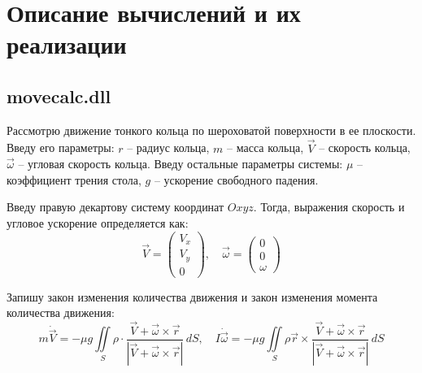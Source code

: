 \documentclass[12pt]{report}
\begin{document}
\section*{\centering Описание вычислений и их реализации}
\subsection*{\centering movecalc.dll}
\indent \indent
Рассмотрю движение тонкого кольца по шероховатой поверхности в ее плоскости.
Введу его параметры: $r$ -- радиус кольца, $m$ -- масса кольца, $\vec V$ -- скорость кольца, $\vec \omega$ -- угловая скорость кольца.
Введу остальные параметры системы: $\mu$ -- коэффициент трения стола, $g$ -- ускорение свободного падения.

Введу правую декартову систему координат $Oxyz$. Тогда, выражения скорость и угловое ускорение определяется как:
\begin{equation*}
	\vec V = \begin{pmatrix} V_x \\  V_y \\ 0 \end{pmatrix}, \quad \vec \omega = \begin{pmatrix} 0 \\ 0 \\ \omega \end{pmatrix}
\end{equation*}

Запишу закон изменения количества движения и  закон изменения момента количества движения:
\begin{equation*}
	m \dot{\vec V} = -\mu g \iint \limits_S \rho \cdot \frac{\vec V + \vec \omega \times \vec r}{|\vec V + \vec \omega \times \vec r|} \,dS, \quad I \dot{\vec \omega} = -\mu g \iint \limits_S \rho \vec r \times \frac{\vec V + \vec \omega \times \vec r}{|\vec V + \vec \omega \times \vec r|} \,dS
\end{equation*}
\end{document}
